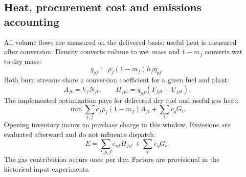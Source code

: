 \documentclass[11pt,a4paper]{article}
\begin{document}
\subsection{Heat, procurement cost and emissions accounting}
All volume flows are measured on the delivered basis; useful heat is measured
after conversion. Density converts volume to wet mass and \(1-m_f\) converts
wet to dry mass:
\begin{equation}\label{eq:coefficient}
q_{pf}=\rho_f(1-m_f)h_f\eta_{pf}.
\end{equation}
Both burn streams share a conversion coefficient for a given fuel and plant:
\begin{equation}\label{eq:delivery}
A_{ft}=V_fN_{ft},\qquad H_{fpt}=q_{pf}(F_{fpt}+U_{fpt}).
\end{equation}
The implemented optimization pays for delivered dry fuel and useful gas heat:
\begin{equation}\label{eq:cost}
\min \sum_{t,f}c_f\rho_f(1-m_f)A_{ft}+\sum_t c_gG_t.
\end{equation}
Opening inventory incurs no purchase charge in this window. Emissions are
evaluated afterward and do not influence dispatch:
\begin{equation}\label{eq:emissions}
E=\sum_{t,p,f} e_{pf}H_{fpt}+\sum_t e_gG_t .
\end{equation}
The gas contribution occurs once per day. Factors are provisional in the
historical-input experiments.
\end{document}

